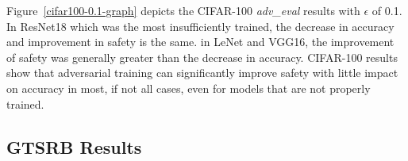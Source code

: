 \documentclass[symmetry,article,submit,moreauthors,pdftex]{Definitions/mdpi}
\begin{document}
Figure~\ref{cifar100-0.1-graph} depicts the CIFAR-100 {\it adv\_eval} results with \begin{math}\epsilon\end{math} of 0.1.
In ResNet18 which was the most insufficiently trained, the decrease in accuracy and improvement in safety is the same.
in LeNet and VGG16, the improvement of safety was generally greater than the decrease in accuracy.
CIFAR-100 results show that adversarial training can significantly improve safety with little impact on accuracy in most, if not all cases, even for models that are not properly trained.

\subsection{GTSRB Results}
\end{document}
